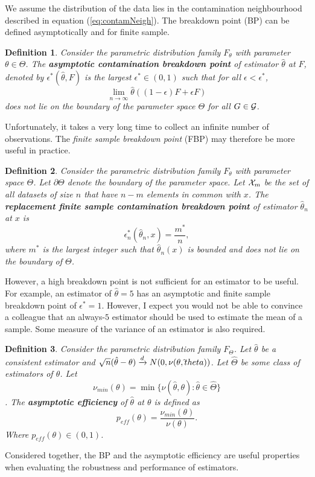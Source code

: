 We assume the distribution of the data lies in the contamination neighbourhood described in equation (\ref{eq:contamNeigh}). The breakdown point (BP) can be defined asymptotically and for finite sample.
\newtheorem{defn}{Definition}[section]
\begin{defn}
\label{def:asympBP}
Consider the parametric distribution family $F_\theta$ with parameter $\theta \in \Theta$. The \textbf{asymptotic contamination breakdown point} of estimator $\hat \theta$ at $F$, denoted by $\epsilon^*(\hat \theta, F)$ is the largest  $\epsilon^* \in (0,1)$ such that for all $\epsilon < \epsilon^*$, $$\lim_{n\xrightarrow{}\infty}\hat\theta((1-\epsilon)F + \epsilon F)$$ does not lie on the boundary of the parameter space $\Theta$ for all $G \in \mathcal{G}$. \cite{maronna2019robust}
\end{defn}
Unfortunately, it takes a very long time to collect an infinite number of observations. The \textit{finite sample breakdown point} (FBP) may therefore be more useful in practice.
\begin{defn}
\label{def:finiteBP}
Consider the parametric distribution family $F_\theta$ with parameter space $\Theta$. Let $\partial \Theta$ denote the boundary of the parameter space. Let $\mathcal{X}_m$ be the set of all datasets of size $n$ that have $n-m$ elements in common with $x$. The \textbf{replacement finite sample contamination breakdown point} of estimator $\hat \theta_n$ at $x$ is $$\epsilon_n^*(\hat \theta_n, x) = \frac{m^*}{n},$$ where
$m^*$ is the largest integer such that $\hat \theta_n(x)$ is bounded and does not lie on the boundary of $\Theta$. \cite{maronna2019robust}
\end{defn}
However, a high breakdown point is not sufficient for an estimator to be useful. For example, an estimator of $\hat \theta = 5$ has an asymptotic and finite sample breakdown point of $\epsilon^* = 1$. However, I expect you would not be able to convince a colleague that an always-$5$ estimator should be used to estimate the mean of a sample. Some measure of the variance of an estimator is also required.
\begin{defn}
\label{def:asympEff}
Consider the parametric distribution family $F_\Theta$. Let $\hat \theta$ be a consistent estimator and $\sqrt{n} (\hat \theta - \theta) \xrightarrow{d} N(0,\nu(\theta,\hat\\theta))$. Let $\hat \Theta$ be some class of estimators of $\theta$. Let
$$\nu_{min}(\theta) = \min\{ \nu(\hat\theta,\theta) : \hat\theta \in \hat\Theta \}$$.
The \textbf{asymptotic efficiency} of $\hat \theta$ at $\theta$ is defined as
$$ p_{eff}(\theta) = \frac{\nu_{min}(\theta)}{\nu(\theta)}. $$
Where $p_{eff}(\theta) \in (0,1)$. \cite{maronna2019robust}
\end{defn}
Considered together, the BP and the asymptotic efficiency are useful properties when evaluating the robustness and performance of estimators.

